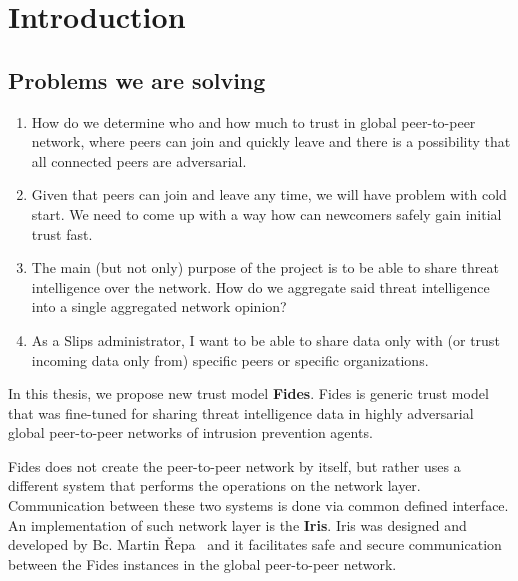 \chapter{Introduction}
\label{ch:introduction}



\section{Problems we are solving}
\begin{enumerate}
\item How do we determine who and how much to trust in global peer-to-peer network, where peers can join and quickly leave and there is a possibility that all connected peers are adversarial.
\item Given that peers can join and leave any time, we will have problem with cold start. We need to come up with a way how can newcomers safely gain initial trust fast.
\item The main (but not only) purpose of the project is to be able to share threat intelligence over the network. How do we aggregate said threat intelligence into a single aggregated network opinion?
\item As a Slips administrator, I want to be able to share data only with (or trust incoming data only from) specific peers or specific organizations.
\end{enumerate}



In this thesis, we propose new trust model \textbf{Fides}.
Fides is generic trust model that was fine-tuned for sharing threat intelligence data in highly adversarial global peer-to-peer networks of intrusion prevention agents.

Fides does not create the peer-to-peer network by itself, but rather uses a different system that performs the operations on the network layer.
Communication between these two systems is done via common defined interface.
An implementation of such network layer is the \textbf{Iris}. Iris was designed and developed by Bc. Martin Řepa~\cite{nl} and it facilitates safe and secure communication between the Fides instances in the global peer-to-peer network.

